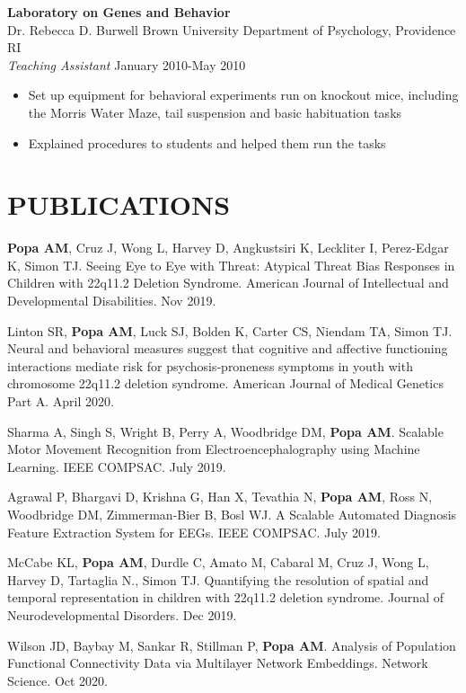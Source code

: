 \documentclass[line,margin,10pt]{res}
\begin{document}
\begin{resume}
 \textbf{Laboratory on Genes and Behavior}\\
 Dr. Rebecca D. Burwell \hfill Brown University Department of Psychology, Providence RI\\
 {\sl Teaching Assistant} \hfill January 2010-May 2010
\begin{itemize}\itemsep -2pt
\item Set up equipment for behavioral experiments run on knockout mice, including the Morris Water Maze, tail suspension and basic habituation tasks
\item Explained procedures to students and helped them run the tasks
\end{itemize}

\section{PUBLICATIONS}
\textbf{Popa AM}, Cruz J, Wong L, Harvey D, Angkustsiri K, Leckliter I, Perez-Edgar K, Simon TJ. Seeing Eye to Eye with Threat: Atypical Threat Bias Responses in Children with 22q11.2 Deletion Syndrome. American Journal of Intellectual and Developmental Disabilities. Nov 2019.

Linton SR,  \textbf{Popa AM},  Luck SJ,  Bolden K,  Carter CS,  Niendam TA, Simon TJ. Neural and behavioral measures suggest that cognitive and affective functioning interactions mediate risk for psychosis‐proneness symptoms in youth with chromosome 22q11.2 deletion syndrome. American Journal of Medical Genetics Part A. April 2020.

Sharma A, Singh S, Wright B, Perry A, Woodbridge DM, \textbf{Popa AM}. Scalable Motor Movement Recognition from Electroencephalography using Machine Learning. IEEE COMPSAC. July 2019.

Agrawal P, Bhargavi D, Krishna G, Han X, Tevathia N, \textbf{Popa AM}, Ross N, Woodbridge DM, Zimmerman-Bier B, Bosl WJ. A Scalable Automated Diagnosis Feature Extraction System for EEGs. IEEE COMPSAC. July 2019.

McCabe KL, \textbf{Popa AM}, Durdle C, Amato M, Cabaral M, Cruz J, Wong L, Harvey D, Tartaglia N., Simon TJ. Quantifying the resolution of spatial and temporal representation in children with 22q11.2 deletion syndrome. Journal of Neurodevelopmental Disorders. Dec 2019.

Wilson JD, Baybay M, Sankar R, Stillman P, \textbf{Popa AM}. Analysis of Population Functional Connectivity Data via Multilayer Network Embeddings. Network Science. Oct 2020.


\end{resume}
\end{document}
